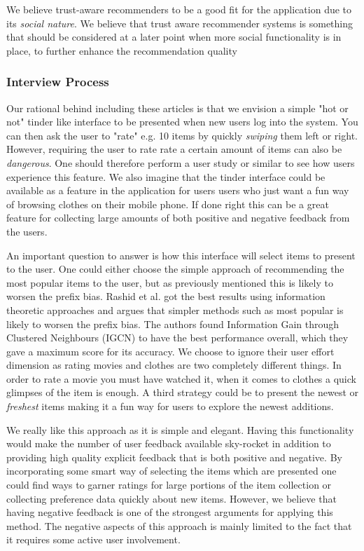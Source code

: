 We believe trust-aware recommenders to be a good fit for the application
due to its \emph{social nature}. We believe that trust aware recommender systems
is something that should be considered at a later point when more social functionality
is in place, to further enhance the recommendation quality

\subsubsection{Interview Process}

Our rational behind including these articles is that we envision a simple "hot
or not" tinder like interface to be presented when new users log into the system.
You can then ask the user to "rate" e.g. 10 items by quickly \emph{swiping} them
left or right. However, requiring the user to rate rate a certain amount of items
can also be \emph{dangerous}. One should therefore perform a user study or similar
to see how users experience this feature. We also imagine that the tinder interface
could be available as a feature in the application for users users who just want a
fun way of browsing clothes on their mobile phone. If done right this can be
a great feature for collecting large amounts of both positive and negative feedback
from the users.

An important question to answer is how this interface will select items to
present to the user. One could either choose the simple approach of
recommending the most popular items to the user, but as previously mentioned
this is likely to worsen the prefix bias. Rashid et al. \cite{Rashid2008} got
the best results using information theoretic approaches and argues that simpler
methods such as most popular is likely to worsen the prefix bias. The authors
found Information Gain through Clustered Neighbours (IGCN) to have the best
performance overall, which they gave a maximum score for its accuracy. We choose
to ignore their user effort dimension as rating movies and clothes are two
completely different things. In order to rate a movie you must have watched
it, when it comes to clothes a quick glimpses of the item is enough.
A third strategy could be to present the newest or \emph{freshest} items
making it a fun way for users to explore the newest additions.

We really like this approach as it is simple and elegant. Having this
functionality would make the number of user feedback available sky-rocket in addition
to providing high quality explicit feedback that is both positive and negative.
By incorporating some smart way of selecting the items which are presented
one could find ways to garner ratings for large portions of the item collection
or collecting preference data quickly about new items. However, we believe
that having negative feedback is one of the strongest arguments for applying
this method. The negative aspects of this approach is mainly limited to the fact
that it requires some active user involvement.

